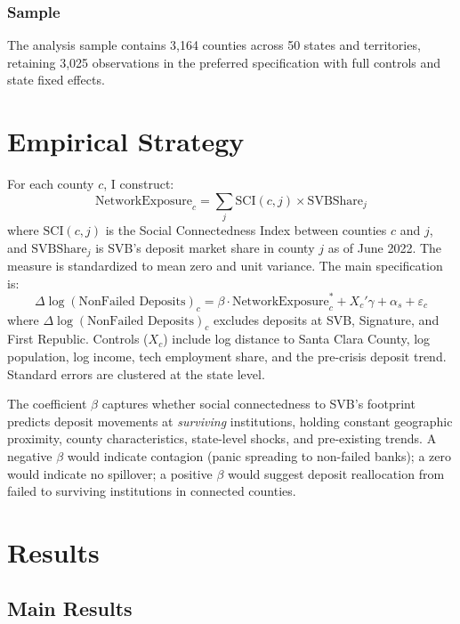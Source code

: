 \documentclass[12pt]{article}
\begin{document}
\subsubsection*{Sample} The analysis sample contains 3,164 counties across 50 states and territories, retaining 3,025 observations in the preferred specification with full controls and state fixed effects.



\section{Empirical Strategy}

For each county $c$, I construct:
\begin{equation}
\text{NetworkExposure}_c = \sum_{j} \text{SCI}(c, j) \times \text{SVBShare}_j
\end{equation}
where $\text{SCI}(c,j)$ is the Social Connectedness Index between counties $c$ and $j$, and $\text{SVBShare}_j$ is SVB's deposit market share in county $j$ as of June 2022. The measure is standardized to mean zero and unit variance. The main specification is:
\begin{equation}
\Delta \log(\text{NonFailed Deposits})_c = \beta \cdot \text{NetworkExposure}^*_c + X_c'\gamma + \alpha_s + \varepsilon_c
\label{eq:main}
\end{equation}
where $\Delta \log(\text{NonFailed Deposits})_c$ excludes deposits at SVB, Signature, and First Republic. Controls ($X_c$) include log distance to Santa Clara County, log population, log income, tech employment share, and the pre-crisis deposit trend. Standard errors are clustered at the state level.

The coefficient $\beta$ captures whether social connectedness to SVB's footprint predicts deposit movements at \textit{surviving} institutions, holding constant geographic proximity, county characteristics, state-level shocks, and pre-existing trends. A negative $\beta$ would indicate contagion (panic spreading to non-failed banks); a zero would indicate no spillover; a positive $\beta$ would suggest deposit reallocation from failed to surviving institutions in connected counties.

\section{Results}

\subsection{Main Results}
\end{document}
